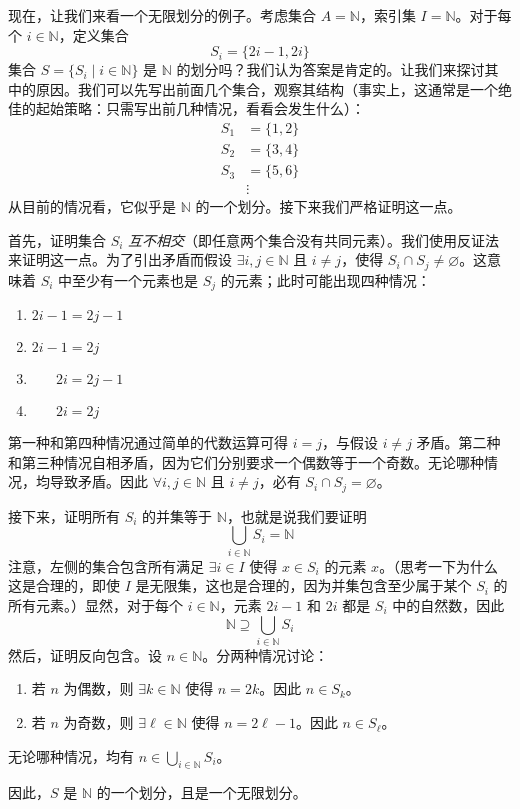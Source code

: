 \begin{example}
    现在，让我们来看一个无限划分的例子。考虑集合 $A = \mathbb{N}$，索引集 $I = \mathbb{N}$。对于每个 $i \in \mathbb{N}$，定义集合
    \[S_i = \{2i - 1, 2i\}\]
    集合 $S = \{S_i \mid i \in \mathbb{N}\}$ 是 $\mathbb{N}$ 的划分吗？我们认为答案是肯定的。让我们来探讨其中的原因。我们可以先写出前面几个集合，观察其结构（事实上，这通常是一个绝佳的起始策略：只需写出前几种情况，看看会发生什么）：
    \begin{align*}
        S_1 & = \{1, 2\} \\
        S_2 & = \{3, 4\} \\
        S_3 & = \{5, 6\} \\
        &\vdots
    \end{align*}
    从目前的情况看，它似乎是 $\mathbb{N}$ 的一个划分。接下来我们严格证明这一点。

    首先，证明集合 $S_i$ \emph{互不相交}（即任意两个集合没有共同元素）。我们使用反证法来证明这一点。为了引出矛盾而假设 $\exists i, j \in \mathbb{N}$ 且 $i \ne j$，使得 $S_i \cap S_j \ne \varnothing$。这意味着 $S_i$ 中至少有一个元素也是 $S_j$ 的元素；此时可能出现四种情况：
    \begin{enumerate}
        \item $2i - 1 = 2j - 1$
        \item $2i - 1 = 2j$
        \item $\quad \enspace \: 2i = 2j - 1$
        \item $\quad \enspace \: 2i = 2j$
    \end{enumerate}
    第一种和第四种情况通过简单的代数运算可得 $i = j$，与假设 $i \ne j$ 矛盾。第二种和第三种情况自相矛盾，因为它们分别要求一个偶数等于一个奇数。无论哪种情况，均导致矛盾。因此 $\forall i, j \in \mathbb{N}$ 且 $i \ne j$，必有 $S_i \cap S_j = \varnothing$。

    接下来，证明所有 $S_i$ 的并集等于 $\mathbb{N}$，也就是说我们要证明
    \[\bigcup_{i \in \mathbb{N}} S_i = \mathbb{N}\]
    注意，左侧的集合包含所有满足 $\exists i \in I$ 使得 $x \in S_i$ 的元素 $x$。（思考一下为什么这是合理的，即使 $I$ 是无限集，这也是合理的，因为并集包含至少属于某个 $S_i$ 的所有元素。）显然，对于每个 $i \in \mathbb{N}$，元素 $2i - 1$ 和 $2i$ 都是 $S_i$ 中的自然数，因此
    \[\mathbb{N} \supseteq \bigcup_{i \in \mathbb{N}} S_i\]
    然后，证明反向包含。设 $n \in \mathbb{N}$。分两种情况讨论：
    \begin{enumerate}[label=(\arabic*)]
        \item 若 $n$ 为偶数，则 $\exists k \in \mathbb{N}$ 使得 $n = 2k$。因此 $n \in S_k$。
        \item 若 $n$ 为奇数，则 $\exists \ell \in \mathbb{N}$ 使得 $n = 2\ell-1$。因此 $n \in S_\ell$。
    \end{enumerate}
    无论哪种情况，均有 $\displaystyle n \in \bigcup_{i \in \mathbb{N}} S_i$。

    因此，$S$ 是 $\mathbb{N}$ 的一个划分，且是一个无限划分。
\end{example}

